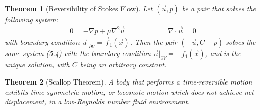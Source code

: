 \documentclass[11pt]{book}
\theoremstyle{break}
\theoremstyle{break}
\newtheorem{thm}{Theorem}[section]
\newcommand{\pd}{\partial}
\begin{document}
\begin{thm}[Reversibility of Stokes Flow]
Let $(\vec{u},p)$ be a pair that solves the following system:
\begin{align}
0 = -\nabla p + \mu \nabla^2 \vec{u} \qquad\qquad\qquad \nabla \cdot \vec{u}=0
\end{align}
with boundary condition $\vec{u}|_{\pd V} = \vec{f}_1(\vec{x})$. Then the pair $(-\vec{u},C-p)$ solves the same system (5.4) with the boundary condition $\vec{u}|_{\pd V} = -f_1(\vec{x})$, and is the unique solution, with $C$ being an arbitrary constant.
\end{thm}
\begin{thm}[Scallop Theorem]
A body that performs a time-reversible motion exhibits time-symmetric motion, or locomote motion which does not achieve net displacement, in a low-Reynolds number fluid environment.
\end{thm}
\end{document}
